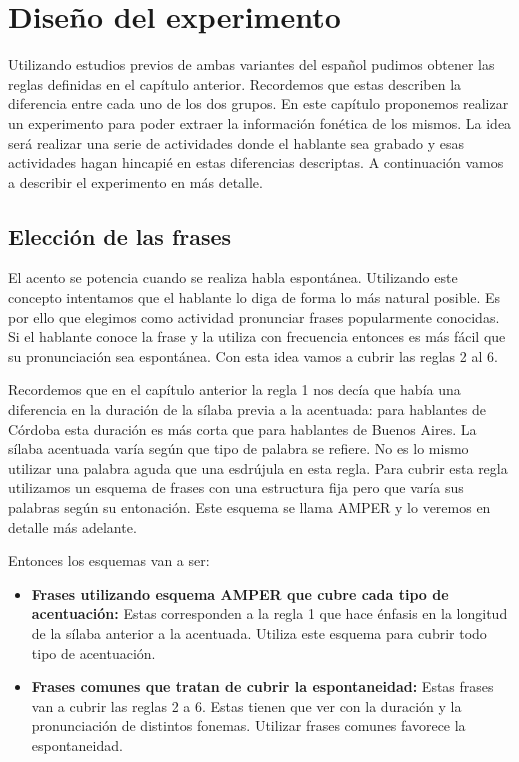\chapter{Diseño del experimento}

Utilizando estudios previos de ambas variantes del español pudimos obtener las reglas definidas en el capítulo anterior. Recordemos que estas describen la diferencia entre cada uno de los dos grupos. En este capítulo proponemos realizar un experimento para poder extraer la información fonética de los mismos. La idea será realizar una serie de actividades donde el hablante sea grabado y esas actividades hagan hincapié en estas diferencias descriptas. A continuación vamos a describir el experimento en más detalle.

\section{Elección de las frases}

El acento se potencia cuando se realiza habla espontánea. Utilizando este concepto intentamos que el hablante lo diga de forma lo más natural posible. Es por ello que elegimos como actividad pronunciar frases popularmente conocidas. Si el hablante conoce la frase y la utiliza con frecuencia entonces es más fácil que su pronunciación sea espontánea. Con esta idea vamos a cubrir las reglas 2 al 6. 

Recordemos que en el capítulo anterior la regla 1 nos decía que había una diferencia en la duración de la sílaba previa a la acentuada: para hablantes de Córdoba esta duración es más corta que para hablantes de Buenos Aires. La sílaba acentuada varía según que tipo de palabra se refiere. No es lo mismo utilizar una palabra aguda que una esdrújula en esta regla. Para cubrir esta regla utilizamos un esquema de frases con una estructura fija pero que varía sus palabras según su entonación. Este esquema se llama AMPER \cite{amper} y lo veremos en detalle más adelante.

Entonces los esquemas van a ser: 

\begin{itemize}
  \item \textbf{Frases utilizando esquema AMPER que cubre cada tipo de acentuación:} Estas corresponden a la regla 1 que hace énfasis en la longitud de la sílaba anterior a la acentuada. Utiliza este esquema para cubrir todo tipo de acentuación.
  \item \textbf{Frases comunes que tratan de cubrir la espontaneidad:} Estas frases van a cubrir las reglas 2 a 6. Estas tienen que ver con la duración y la pronunciación de distintos fonemas. Utilizar frases comunes favorece la espontaneidad.
\end{itemize}


